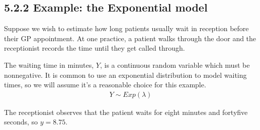 \documentclass[letterpaper,10pt,english]{jupyterBook}
\begin{document}
\subsection{5.2.2 Example: the Exponential model}
\label{\detokenize{05.c. Likelihood:example-the-exponential-model}}
\sphinxAtStartPar
Suppose we wish to estimate how long patients usually wait in reception before their GP appointment. At one practice, a patient walks through the door and the receptionist records the time until they get called through.

\sphinxAtStartPar
{} The waiting time in minutes, \(Y\), is a continuous random variable which must be non\sphinxhyphen{}negative. It is common to use an exponential distribution to model waiting times, so we will assume it’s a reasonable choice for this example.
\begin{equation*}
\begin{split} 
Y \sim Exp(\lambda) 
\end{split}
\end{equation*}
\sphinxAtStartPar
{}

\sphinxAtStartPar
{} The receptionist observes that the patient waits for eight minutes and forty\sphinxhyphen{}five seconds, so \(y = 8.75\).
\end{document}
